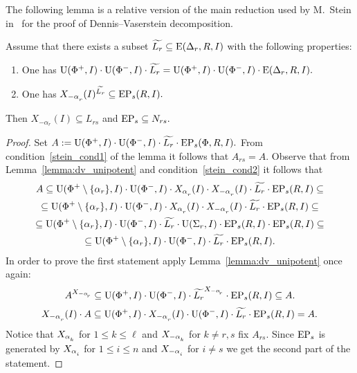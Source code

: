 The following lemma is a relative version of the main reduction used by M.~Stein in~\cite{St78} for the proof of Dennis--Vaserstein decomposition.
\begin{lemma}\label{Stein_reduction}
Assume that there exists a subset $\widetilde{L_r} \subseteq \operatorname{E}(\Delta_r, R, I)$ with the following properties:
\begin{enumerate}[label=(\alph*)] 
 \item\label{stein_cond1} One has $\operatorname{U}(\Phi^+, I)\cdot \operatorname{U}(\Phi^-, I) \cdot \widetilde{L_r} = \operatorname{U}(\Phi^+, I)\cdot \operatorname{U}(\Phi^-, I) \cdot \operatorname{E}(\Delta_r, R, I).$
 \item\label{stein_cond2} One has $X_{-\alpha\ssub{r}}(I)^{\widetilde{L_r}} \subseteq \EP_s(R, I).$
\end{enumerate}
Then $X_{-\alpha_r}(I) \subseteq L_{rs}$ and $\operatorname{EP}_s \subseteq N_{rs}.$
\end{lemma}
\begin{proof} Set $A:=\operatorname{U}(\Phi^+, I)\cdot \operatorname{U}(\Phi^-, I) \cdot \widetilde{L_r} \cdot \operatorname{EP}_s(\Phi, R, I).$
From condition~\ref{stein_cond1} of the lemma it follows that $A_{rs}=A$.
Observe that from Lemma~\ref{lemma:dv_unipotent} and condition~\ref{stein_cond2} it follows that
\begin{multline}\nonumber 
A \subseteq \U(\Phi^+\setminus \{\alpha_r\}, I) \cdot \U(\Phi^-, I) \cdot X_{\alpha\ssub{r}}(I) \cdot X_{-\alpha\ssub{r}}(I) \cdot \widetilde{L_r} \cdot \EP_s(R, I) \subseteq \\ 
\subseteq \U(\Phi^+\setminus\{\alpha_r\}, I) \cdot \U(\Phi^-, I) \cdot X_{\alpha\ssub{r}}(I) \cdot X_{-\alpha\ssub{r}}(I) \cdot \widetilde{L_r} \cdot \EP_s(R, I) \subseteq \\
\subseteq \U(\Phi^+\setminus\{\alpha_r\}, I) \cdot \U(\Phi^-, I) \cdot \widetilde{L_r} \cdot \U(\Sigma_r, I) \cdot \EP_s(R, I)  \cdot \EP_s(R, I) \subseteq \\
\subseteq \U(\Phi^+\setminus\{\alpha_r\}, I) \cdot \U(\Phi^-, I) \cdot \widetilde{L_r} \cdot \EP_s(R, I). \end{multline}
In order to prove the first statement apply Lemma~\ref{lemma:dv_unipotent} once again:
\begin{equation}\nonumber A^{X_{-\alpha\ssub{r}}} \subseteq \U(\Phi^+, I) \cdot \U(\Phi^-, I) \cdot \widetilde{L_r} ^{X_{-\alpha\ssub{r}}} \cdot \EP_s(R, I) \subseteq A. \end{equation}
\begin{equation}\nonumber X_{-\alpha\ssub{r}}(I) \cdot A \subseteq \U(\Phi^+, I) \cdot X_{-\alpha\ssub{r}}(I) \cdot \U(\Phi^-, I) \cdot \widetilde{L_r} \cdot \EP_s(R, I) = A. \end{equation}
Notice that $X_{\alpha\ssub{k}}$ for $1\leq k\leq \ell$ and $X_{-\alpha\ssub{k}}$ for $k\neq r,s$ fix $A_{rs}$.
Since $\operatorname{EP}_s$ is generated by $X_{\alpha\ssub{i}}$ for $1\leq i\leq n$ and $X_{-\alpha\ssub{i}}$ for $i\neq s$ we get the second part of the statement.
\end{proof}


